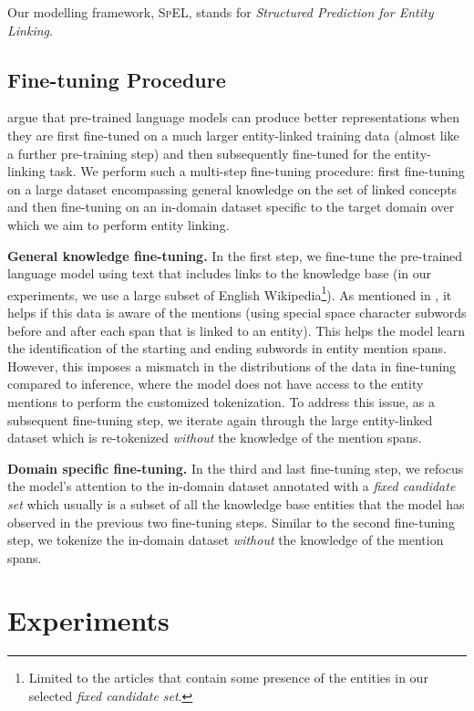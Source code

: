\documentclass[11pt]{article}
\begin{document}
Our modelling framework, \textsc{SpEL}, stands for \textit{Structured Prediction for Entity Linking}.

\subsection{Fine-tuning Procedure}\label{sec:finetuning}
\citet{2021.eacl-main.153} argue that pre-trained language models can produce better representations when they are first fine-tuned on a much larger entity-linked training data (almost like a further pre-training step) and then subsequently fine-tuned for the entity-linking task. We perform such a multi-step fine-tuning procedure: first fine-tuning on a large dataset encompassing general knowledge on the set of linked concepts and then fine-tuning on an in-domain dataset specific to the target domain over which we aim to perform entity linking.


\textbf{General knowledge fine-tuning.} In the first step, we fine-tune the pre-trained language model using text that includes links to the knowledge base (in our experiments, we use a large subset of English Wikipedia\footnote{Limited to the articles that contain some presence of the entities in our selected \textit{fixed candidate set}.}). As mentioned in \cite{K19-1063}, it helps if this data is aware of the mentions (using special space character subwords before and after each span that is linked to an entity). This helps the model learn the identification of the starting and ending subwords in entity mention spans. However, this imposes a mismatch in the distributions of the data in fine-tuning compared to inference, where the model does not have access to the entity mentions to perform the customized tokenization. To address this issue, as a subsequent fine-tuning step, we iterate again through the large entity-linked dataset which is re-tokenized \textit{without} the knowledge of the mention spans. 

\textbf{Domain specific fine-tuning.} In the third and last fine-tuning step, we refocus the model's attention to the in-domain dataset annotated with a \textit{fixed candidate set} which usually is a subset of all the knowledge base entities that the model has observed in the previous two fine-tuning steps. Similar to the second fine-tuning step, we tokenize the in-domain dataset \textit{without} the knowledge of the mention spans. 

\section{Experiments}\label{sec:experiments}
\end{document}
